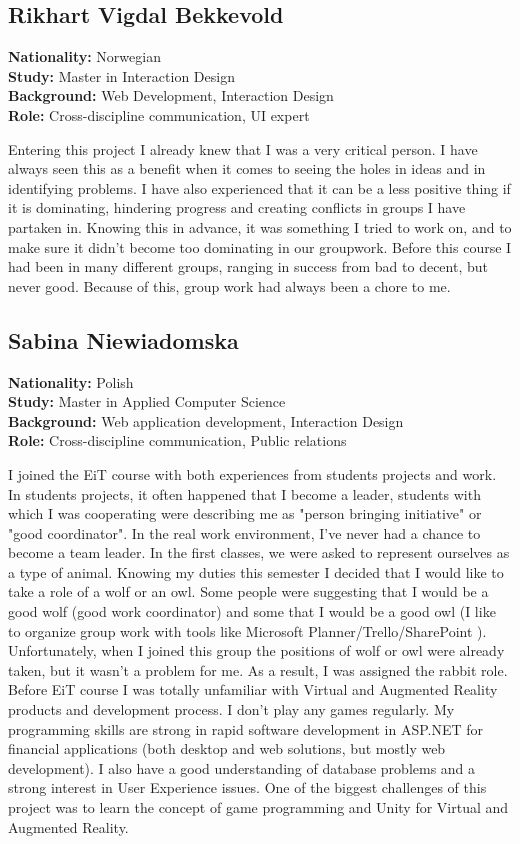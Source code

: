 \subsection{Rikhart Vigdal Bekkevold}
\textbf{Nationality:} Norwegian \\
\textbf{Study:} Master in Interaction Design \\
\textbf{Background:} Web Development, Interaction Design \\
\textbf{Role:} Cross-discipline communication, UI expert

Entering this project I already knew that I was a very critical person. I have always seen this as a benefit when it comes to seeing the holes in ideas and in identifying problems. I have also experienced that it can be a less positive thing if it is dominating, hindering progress and creating conflicts in groups I have partaken in. Knowing this in advance, it was something I tried to work on, and to make sure it didn’t become too dominating in our groupwork. Before this course I had been in many different groups, ranging in success from bad to decent, but never good. Because of this, group work had always been a chore to me.


\subsection{Sabina Niewiadomska}
\textbf{Nationality:} Polish \\
\textbf{Study:} Master in Applied Computer Science \\
\textbf{Background:} Web application development, Interaction Design \\
\textbf{Role:} Cross-discipline communication, Public relations

I joined the EiT course with both experiences from students projects and work. In students projects, it often happened that I become a leader, students with which I was cooperating were describing me as "person bringing initiative" or "good coordinator". In the real work environment, I've never had a  chance to become a team leader. In the first classes, we were asked to represent ourselves as a type of animal. Knowing my duties this semester I decided that I would like to take a role of a wolf or an owl. Some people were suggesting that I would be a good wolf (good work coordinator) and some that I would be a good owl (I like to organize group work with tools like Microsoft Planner/Trello/SharePoint ). Unfortunately, when I joined this group the positions of wolf or owl were already taken, but it wasn't a problem for me. As a result, I was assigned the rabbit role. Before EiT course I was totally unfamiliar with Virtual and Augmented Reality products and development process. I don't play any games regularly. My programming skills are strong in rapid software development in ASP.NET for financial applications (both desktop and web solutions, but mostly web development). I also have a good understanding of database problems and a strong interest in User Experience issues. One of the biggest challenges of this project was to learn the concept of game programming and Unity for Virtual and Augmented Reality.

